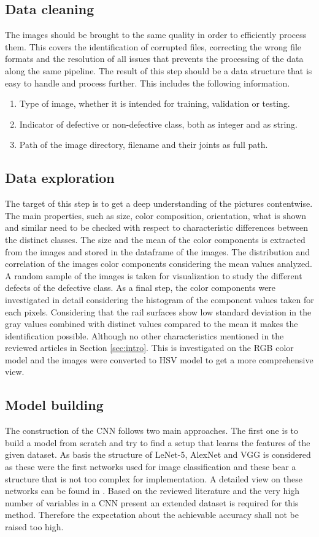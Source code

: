 \documentclass[10pt, final]{article}
\begin{document}
\subsection{Data cleaning}
The images should be brought to the same quality in order to efficiently process them.
This covers the identification of corrupted files, correcting the wrong file formats
and the resolution of all issues that prevents the processing of the data along the same pipeline.
The result of this step should be a data structure that is easy to handle and process further.
This includes the following information.
\begin{enumerate}
	\item Type of image, whether it is intended for training, validation or testing.
	\item Indicator of defective or non-defective class, both as integer and as string.
	\item Path of the image directory, filename and their joints as full path.
\end{enumerate}

\subsection{Data exploration}
The target of this step is to get a deep understanding of the pictures contentwise.
The main properties, such as size, color composition, orientation, what is shown and similar need to be
checked with respect to characteristic differences between the distinct classes.
The size and the mean of the color components is extracted from the images and stored in the dataframe
of the images.
The distribution and correlation of the images color components considering the mean values analyzed.
A random sample of the images is taken for visualization to study the different defects of the defective class.
As a final step, the color components were investigated in detail considering the histogram of the component
values taken for each pixels.
Considering that the rail surfaces show low standard deviation in the gray values combined with distinct
values compared to the mean it makes the identification possible.
Although no other characteristics mentioned in the reviewed articles in Section \ref{sec:intro}.
This is investigated on the RGB color model and the images were converted to HSV model to get a more
comprehensive view.

\subsection{Model building}
The construction of the CNN follows two main approaches.
The first one is to build a model from scratch and try to find a setup that learns the features of the given
dataset.
As basis the structure of LeNet-5, AlexNet and VGG is considered as these were the first networks used for image
classification and these bear a structure that is not too complex for implementation.
A detailed view on these networks can be found in \cite{karim_illustrated_2022}.
Based on the reviewed literature and the very high number of variables in a CNN present an extended dataset is
required for this method.
Therefore the expectation about the achievable accuracy shall not be raised too high.
\end{document}
